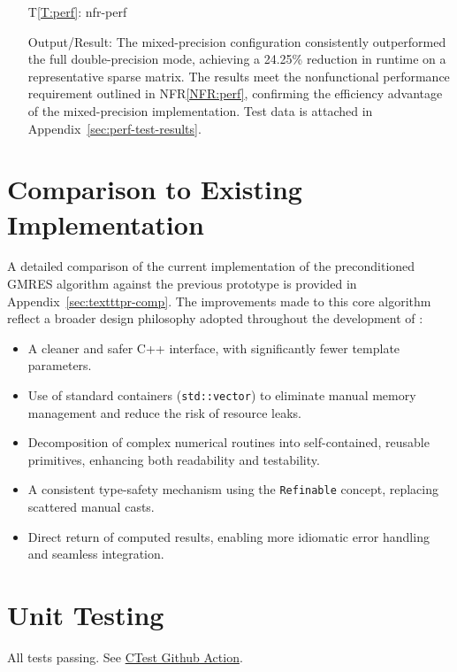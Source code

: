 \documentclass[12pt, titlepage]{article}
\newcommand{\nfrref}[1]{NFR\ref{#1}}
\newcommand{\tref}[1]{T\ref{#1}}
\begin{document}
\begin{itemize}

\item[\tref{T:perf}:]{nfr-perf}

  Output/Result: The mixed-precision configuration consistently outperformed the
  full double-precision mode, achieving a 24.25\% reduction in runtime on a
  representative sparse matrix. The results meet the nonfunctional performance
  requirement outlined in \nfrref{NFR:perf}, confirming the efficiency advantage
  of the mixed-precision implementation. Test data is attached in
  Appendix~\ref{sec:perf-test-results}.

\end{itemize}

\section{Comparison to Existing Implementation}

A detailed comparison of the current implementation of the preconditioned GMRES
algorithm against the previous prototype is provided in
Appendix~\ref{sec:textttpr-comp}. The improvements made to this core algorithm
reflect a broader design philosophy adopted throughout the development of
\progname{}:

\begin{itemize}
\item A cleaner and safer C++ interface, with significantly fewer template
  parameters.
\item Use of standard containers (\texttt{std::vector}) to eliminate manual memory
  management and reduce the risk of resource leaks.
\item Decomposition of complex numerical routines into self-contained, reusable
  primitives, enhancing both readability and testability.
\item A consistent type-safety mechanism using the \texttt{Refinable} concept, replacing
  scattered manual casts.
\item Direct return of computed results, enabling more idiomatic error handling and
  seamless integration.
\end{itemize}

\section{Unit Testing}
\label{sec:unit-testing}

All tests passing. See
\href{https://github.com/yex33/MPIR/actions/workflows/ctest.yml}{CTest Github
  Action}.
\end{document}
